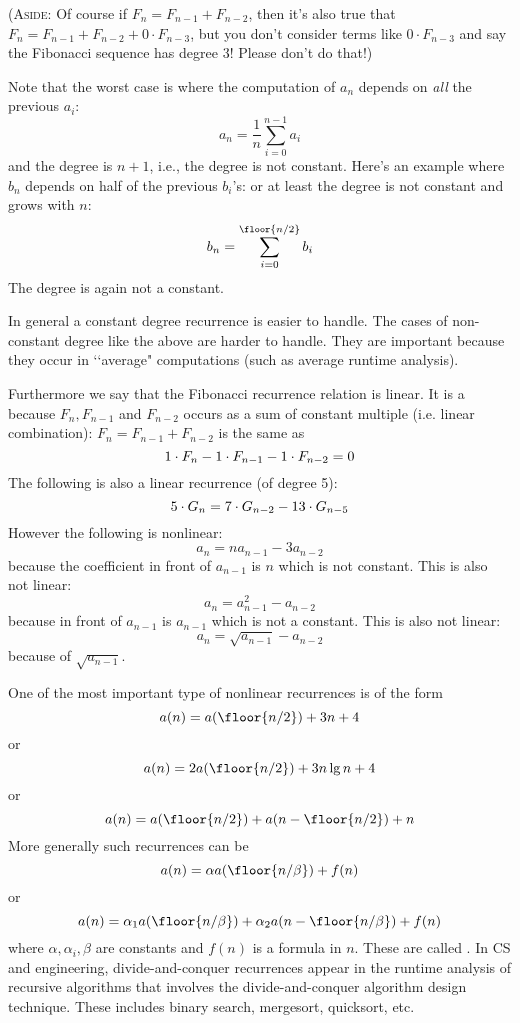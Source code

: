 (\textsc{Aside}: Of course if 
$F_n = F_{n-1} + F_{n-2}$, then
it's also true that
$F_n = F_{n-1} + F_{n-2} + 0 \cdot F_{n-3}$, but you don't
consider terms like $0 \cdot F_{n-3}$ and say the Fibonacci
sequence has degree $3$! Please don't do that!)

Note that the worst case is where the computation of
$a_n$ depends on \textit{all} the previous $a_i$:
\[
a_n = \frac{1}{n} \sum_{i = 0}^{n-1} a_i
\]
and the degree is $n + 1$, i.e., the degree is not constant.
Here's an example where $b_n$ depends on half of the previous
$b_i$'s:
or at least the degree is not constant and grows with $n$:
\[
b_n = \sum_{i = 0}^{\floor{n/2}} b_i
\]
The degree is again not a constant.

In general a constant degree recurrence is easier to handle.
The cases of non-constant degree like the above are harder to
handle.
They are important because they occur in
\lq\lq average" computations (such as average runtime analysis).



Furthermore we say that the Fibonacci recurrence relation is
linear.
It is a  because
$F_n, F_{n-1}$ and $F_{n-2}$
occurs as a sum of constant multiple (i.e. linear combination):
$F_{n} = F_{n-1} + F_{n-2}$ is the same as
\[
1 \cdot F_n - 1 \cdot F_{n-1} - 1 \cdot F_{n-2} = 0\\
\]
The following is also a linear recurrence (of degree 5):
\[
5 \cdot G_n = 7 \cdot G_{n-2} - 13 \cdot G_{n-5} \\
\]
However the following is nonlinear:
\[
a_n = n a_{n-1} - 3a_{n-2}
\]
because the coefficient in front of $a_{n-1}$ is $n$ which is not constant.
This is also not linear:
\[
a_n = a_{n-1}^2 - a_{n-2}
\]
because in front of $a_{n-1}$ is $a_{n-1}$ which is not a constant.
This is also not linear:
\[
a_n = \sqrt{a_{n-1}} - a_{n-2}
\]
because of $\sqrt{a_{n-1}}$.






One of the most important type of nonlinear recurrences is of the form
\[
a(n) = a(\floor{n/2}) + 3n + 4
\]
or
\[
a(n) = 2a(\floor{n/2}) + 3n \lg n + 4
\]
or
\[
a(n) = a(\floor{n/2}) + a(n - \floor{n/2}) + n
\]
More generally such recurrences can be
\[
a(n) =  \alpha a(\floor{n/\beta}) + f(n)
\]
or
\[
a(n) =  \alpha_1 a(\floor{n/\beta}) + \alpha_2 a(n - \floor{n/\beta}) + f(n)
\]
where $\alpha, \alpha_i, \beta$ are constants and $f(n)$ is a formula in $n$.
These are called .
In CS and engineering,
divide-and-conquer recurrences appear in the runtime analysis
of recursive algorithms
that involves the divide-and-conquer algorithm design technique.
These includes binary search, mergesort, quicksort, etc.

